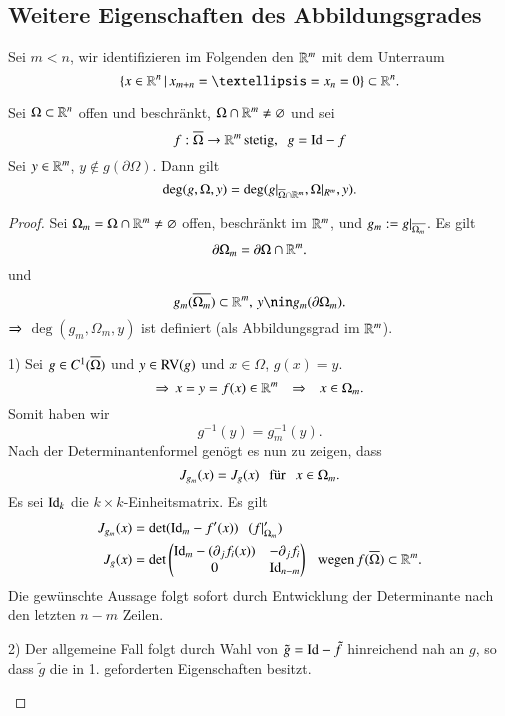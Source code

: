 \subsection{Weitere Eigenschaften des Abbildungsgrades}

Sei $m<n$, wir identifizieren im Folgenden den $\mathbb{R}^m$ mit dem Unterraum
\[
    \{x\in \R^n \, | \, x_{m+n}=…=x_n=0\}\subset \R^n.
\]

\begin{theorem}\label{2.14}
    Sei $\Omega \subset \mathbb{R}^n$ offen und beschränkt, $\Omega \cap \mathbb{R}^m \neq \varnothing$ und sei
    \[
        f:\overline \Omega \rightarrow \mathbb{R}^m\, \text{stetig,} \hspace{.25cm} g=\mathrm{Id}-f
    \]
    Sei $y\in \mathbb{R}^m$, $y\nin g(\partial \Omega)$. Dann gilt
    \[
        \deg(g,\Omega,y)=\deg(g|_{\overline{\Omega}\cap\mathbb{R}^m},\Omega|_{R^m},y).
    \]
\end{theorem}

\begin{proof}
    Sei $\Omega_m=\Omega\cap\mathbb{R}^m\neq \varnothing$ offen, beschränkt im $\mathbb{R}^m$, und
    $g_m:=g|_{\overline{\Omega_m}}$. Es gilt
    \[
        \partial \Omega_m=\partial\Omega\cap\mathbb{R}^m.
    \]
    und
    \[
        g_m(\ol{\Omega_m})\subset\R^m,\, y\nin g_m(\partial\Omega_m).
    \]
    $\Rightarrow$ $\deg(g_m,\Omega_m,y)$ ist definiert (als Abbildungsgrad im $\mathbb{R}^m$).
    \begin{description}
        \item{1)}
        Sei $g\in C^1(\overline \Omega)$ und $y\in \mathrm{RV}(g)$ und $x\in \Omega$, $g(x)=y$.
        \[
        \Rightarrow \, x=y=f(x)\in \mathbb{R}^m \hspace{.25cm} \Rightarrow \hspace{.25cm} x\in \Omega_m.
        \]
        Somit haben wir
        \[
            g^{-1}(y)=g_m^{-1}(y).
        \]
        Nach der Determinantenformel genögt es nun zu zeigen, dass
        \[
            J_{g_m}(x)=J_g(x) \hspace{.25cm} \text{für} \hspace{.25cm} x\in \Omega_m.
        \]
        Es sei $\mathrm{Id}_k$ die $k\times k$-Einheitsmatrix. Es gilt
        \begin{align*}
            J_{g_m}(x)&=\det(\mathrm{Id}_m-f'(x)) \hspace{.25cm} (f|_{\Omega_m}')\\
            J_g(x)&= \det\begin{pmatrix} \mathrm{Id}_m-(\partial_jf_i(x)) & -\partial_jf_i\\
            0& \mathrm{Id}_{n-m}\end{pmatrix} \hspace{.25cm} \text{wegen} \, f(\overline\Omega)\subset\mathbb{R}^m.
        \end{align*}
        Die gewünschte Aussage folgt sofort durch Entwicklung der Determinante nach den letzten
        $n-m$ Zeilen.
        \item{2)}
        Der allgemeine Fall folgt durch Wahl von $\tilde g=\mathrm{Id}-\tilde f$ hinreichend nah an $g$, so dass
        $\tilde g$ die in 1. geforderten Eigenschaften besitzt.
    \end{description}
    \[ \]
\end{proof}
